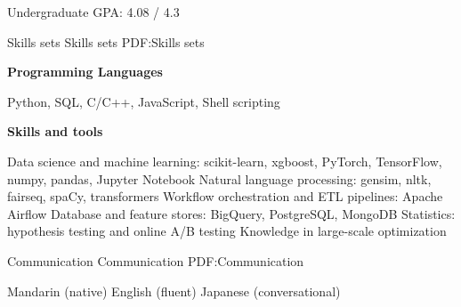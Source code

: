 \documentclass[letterpaper,MMMyyyy,nonstopmode]{simpleresumecv}
\begin{document}
\begin{Body}

\Gap
\SubBulletItem
Undergraduate GPA: 4.08 / 4.3












\BigGap

\Section
{Skills sets}
{Skills sets}
{PDF:Skills sets}

\Entry
\textbf{Programming Languages}

\Gap
Python,
SQL,
C/C++,
JavaScript,
Shell scripting


\BigGap
\Entry
\textbf{Skills and tools}

\Gap\BulletItem Data science and machine learning: scikit-learn, xgboost, PyTorch, TensorFlow, numpy, pandas, Jupyter Notebook
\Gap\BulletItem Natural language processing: gensim, nltk, fairseq, spaCy, transformers
\Gap\BulletItem Workflow orchestration and ETL pipelines: Apache Airflow
\Gap\BulletItem Database and feature stores: BigQuery, PostgreSQL, MongoDB
\Gap\BulletItem Statistics: hypothesis testing and online A/B testing
\Gap\BulletItem Knowledge in large-scale optimization



\BigGap

\Section
{Communication}
{Communication}
{PDF:Communication}

\BigGap

\BulletItem Mandarin (native)
\Gap
\BulletItem English (fluent)
\Gap
\BulletItem Japanese (conversational)







\end{Body}
\end{document}
